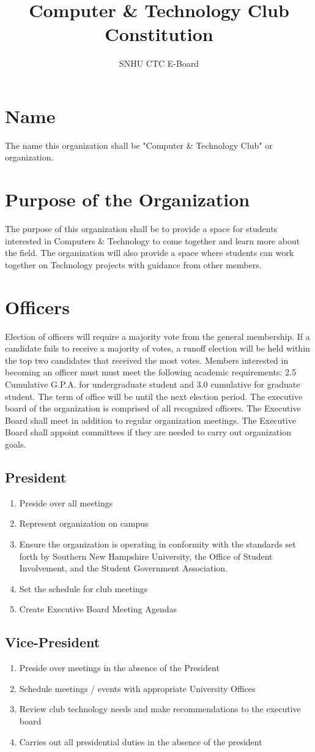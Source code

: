 \documentclass{article}
\title{Computer \& Technology Club Constitution}
\author{SNHU CTC E-Board}
\date{\datechanged}
\newcommand{\article}[1]{\section{#1} \label{#1}}
\newcommand{\asection}[1]{\subsection{#1} \label{#1}}
\begin{document}
\maketitle


\article{Name}
The name this organization shall be "Computer \& Technology Club" or organization.

\article{Purpose of the Organization}
The purpose of this organization shall be to provide a space for students interested in Computers \& Technology to come together and learn more about the field. 
The organization will also provide a space where students can work together on Technology projects with guidance from other members.

\article{Officers}
Election of officers will require a majority vote from the general membership. 
If a candidate fails to receive a majority of votes, a runoff election will be held within the top two candidates that received the most votes. 
Members interested in becoming an officer must must meet the following academic requirements: 2.5 Cumulative G.P.A. for undergraduate student and 3.0 cumulative for graduate student. 
The term of office will be until the next election period. 
The executive board of the organization is comprised of all recognized officers. 
The Executive Board shall meet in addition to regular organization meetings. 
The Executive Board shall appoint committees if they are needed to carry out organization goals.

\asection{President}
\begin{enumerate}
\item Preside over all meetings
\item Represent organization on campus
\item Ensure the organization is operating in conformity with the standards set forth by Southern New Hampshire University, the Office of Student Involvement, and the Student Government Association.
\item Set the schedule for club meetings
\item Create Executive Board Meeting Agendas
\end{enumerate}

\asection{Vice-President}
\begin{enumerate}
\item Preside over meetings in the absence of the President
\item Schedule meetings / events with appropriate University Offices
\item Review club technology needs and make recommendations to the executive board
\item Carries out all presidential duties in the absence of the president
\end{enumerate}
\end{document}
